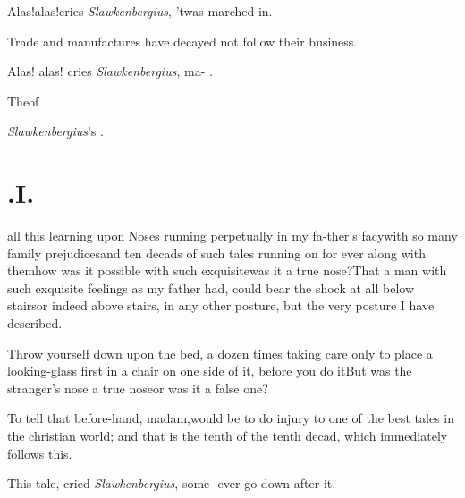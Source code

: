 \documentclass[twoside]{article}
\begin{document}
Alas!\@ alas!\@ cries \textit{Slawkenbergius}, ’twas\break
{}
marched in.

Trade and manufactures have decayed\break
{}
not follow their business.

Alas! alas! cries \textit{Slawkenbergius}, ma-\break
{}
.

\bigskip
\centerline{The\enspace {}\enspace of}
\centerline{\textit{Slawkenbergius}’s .}

\bigskip

\newpage\null
\section{.\enspace I.}

 all this learning upon Noses
running perpetually in my fa-\break ther’s facy\sic\tsk with so
many family prejudices\tsk and ten decads of such tales
running on for ever along with them\tsk how was it possible
with such exquisite\tsk was it a true nose?\tsk That a man
with such exquisite feelings as my father had, could bear
the shock at all below stairs\tsk or indeed above stairs, in
any other posture, but the very posture I have described.

\tsk Throw yourself down upon the bed, a dozen times\tsk
taking care only to place a looking-glass first in a chair
on one side of it, before you do it\tsh But was the
stranger’s nose a true nose\tsk or was it a false one?

To tell that before-hand, madam,\break would be to do injury to one of
the best tales in the christian world; and that is the tenth of the
tenth decad, which immediately follows this.

This tale, cried \textit{Slawkenbergius}, some-\break
{}
ever go down after it.
\end{document}
